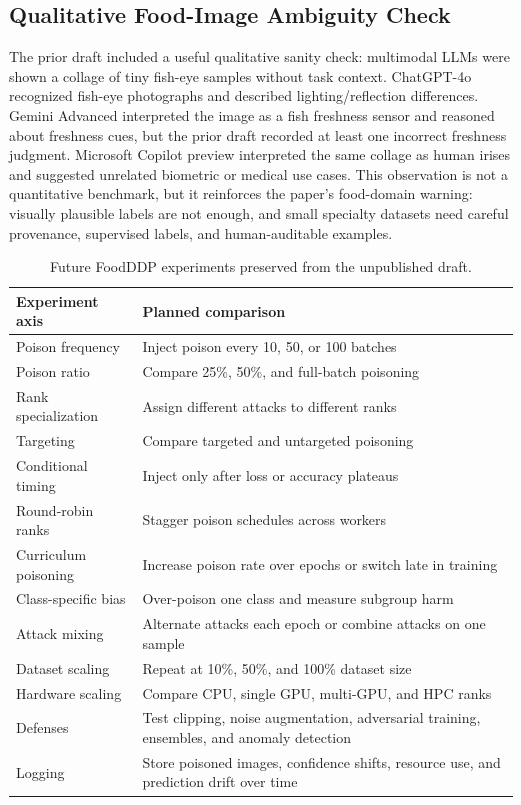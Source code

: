 \documentclass[conference]{IEEEtran}
\begin{document}
\subsection{Qualitative Food-Image Ambiguity Check}

The prior draft included a useful qualitative sanity check: multimodal LLMs were shown a collage of tiny fish-eye samples without task context. ChatGPT-4o recognized fish-eye photographs and described lighting/reflection differences. Gemini Advanced interpreted the image as a fish freshness sensor and reasoned about freshness cues, but the prior draft recorded at least one incorrect freshness judgment. Microsoft Copilot preview interpreted the same collage as human irises and suggested unrelated biometric or medical use cases. This observation is not a quantitative benchmark, but it reinforces the paper's food-domain warning: visually plausible labels are not enough, and small specialty datasets need careful provenance, supervised labels, and human-auditable examples.

\begin{table}[t]
\centering
\caption{Future FoodDDP experiments preserved from the unpublished draft.}
\label{tab:futurefoodddp}
\small
\begin{tabular}{p{}p{}}
\toprule
Experiment axis & Planned comparison \\
\midrule
Poison frequency & Inject poison every 10, 50, or 100 batches \\
Poison ratio & Compare 25\%, 50\%, and full-batch poisoning \\
Rank specialization & Assign different attacks to different ranks \\
Targeting & Compare targeted and untargeted poisoning \\
Conditional timing & Inject only after loss or accuracy plateaus \\
Round-robin ranks & Stagger poison schedules across workers \\
Curriculum poisoning & Increase poison rate over epochs or switch late in training \\
Class-specific bias & Over-poison one class and measure subgroup harm \\
Attack mixing & Alternate attacks each epoch or combine attacks on one sample \\
Dataset scaling & Repeat at 10\%, 50\%, and 100\% dataset size \\
Hardware scaling & Compare CPU, single GPU, multi-GPU, and HPC ranks \\
Defenses & Test clipping, noise augmentation, adversarial training, ensembles, and anomaly detection \\
Logging & Store poisoned images, confidence shifts, resource use, and prediction drift over time \\
\bottomrule
\end{tabular}
\end{table}
\end{document}
